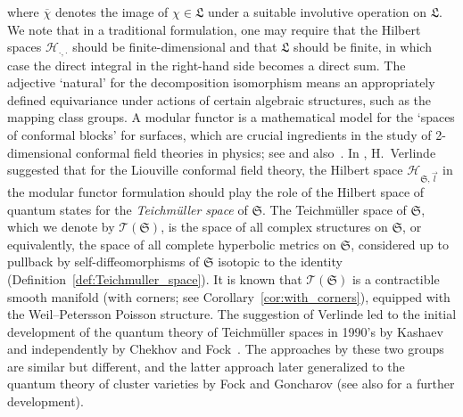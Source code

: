 \documentclass[pdftex]{sigma}
\numberwithin{equation}{section}
\theoremstyle{definition}
\newcommand{\ol}[1]{\overline{#1}}
\begin{document}
where $\ol{\chi}$ denotes the image of $\chi \in \mathfrak{L}$ under a suitable involutive operation on $\mathfrak{L}$. We note that in a traditional formulation, one may require that the Hilbert spaces $\mathscr{H}_{\cdot,\cdot}$ should be finite-dimensional and that $\mathfrak{L}$ should be finite, in which case the direct integral in the right-hand side becomes a direct sum. The adjective `natural' for the decomposition isomorphism means an appropriately defined equivariance under actions of certain algebraic structures, such as the mapping class groups.
A modular functor is a mathematical model for the `spaces of conformal blocks' for surfaces, which are crucial ingredients in the study of 2-dimensional conformal field theories in physics; see \cite{BK, MS, Segal} and also~\cite{T}. In \cite{Verlinde}, H.~Verlinde suggested that for the Liouville conformal field theory, the Hilbert space $\mathscr{H}_{\mathfrak{S},\vec{l}}$ in the modular functor formulation should play the role of the Hilbert space of quantum states for the {\it Teichm\"uller space} of $\mathfrak{S}$. The Teichm\"uller space of $\mathfrak{S}$, which we denote by $\mathscr{T}(\mathfrak{S})$, is the space of all complex structures on $\mathfrak{S}$, or equivalently, the space of all complete hyperbolic metrics on $\mathfrak{S}$, considered up to pullback by self-diffeomorphisms of $\mathfrak{S}$ isotopic to the identity (Definition~\ref{def:Teichmuller_space}). It is known that $\mathscr{T}(\mathfrak{S})$ is a contractible smooth manifold (with corners; see Corollary~\ref{cor:with_corners}), equipped with the Weil--Petersson Poisson structure. The suggestion of Verlinde led to the initial development of the quantum theory of Teichm\"uller spaces in 1990's by Kashaev \cite{Kash98} and independently by Chekhov and Fock~\cite{F97, CF}. The approaches by these two groups are similar but different, and the latter approach later generalized to the quantum theory of cluster varieties by Fock and Goncharov \cite{FG09} (see also \cite{JLSS} for a further development).
\end{document}
